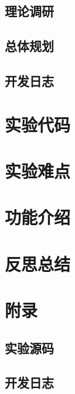 	\subsection{理论调研}
	\subsection{总体规划}
	\subsection{开发日志}
	\newpage
	\section{实验代码}
	\newpage
	\subsection{}
	
	\subsection{}
	\section{实验难点}
	
	\section{功能介绍}
	
	\section{反思总结}
	
	
	
	\newpage
	\section{附录}
	\subsection{实验源码}
		
		\newpage
	\subsection{开发日志}
	\begin{thebibliography}{3}
	\end{thebibliography}
	



